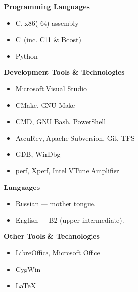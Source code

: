 \documentclass[11pt]{article}
\newcommand\CXX{C\nolinebreak[4]\hspace{-.05em}\raisebox{.4ex}{\relsize{-3}{\textbf{++}}}}
\newcommand\CvBigSkipLength{1em}
\newcommand\CvSkip[1]{\vspace{#1}}
\newcommand\CvBigSkip{\CvSkip{\CvBigSkipLength}}
\newcommand\CvSectionHeader[1]{\CvBigSkip\textbf{#1}\CvBigSkip}
\begin{document}
\begin{minipage}[t]{.5\linewidth}
  \CvSectionHeader{Programming Languages}

  \begin{itemize}
    \item C, x86(-64) assembly
    \item \CXX\ (inc. {\CXX}11 \& Boost)
    \item Python
  \end{itemize}

  \CvSectionHeader{Development Tools \& Technologies}

  \begin{itemize}
    \item Microsoft Visual Studio
    \item CMake, GNU Make
    \item CMD, GNU Bash, PowerShell
    \item AccuRev, Apache Subversion, Git, TFS
    \item GDB, WinDbg
    \item perf, Xperf, Intel VTune Amplifier
  \end{itemize}
\end{minipage}
\begin{minipage}[t]{.5\linewidth}
  \CvSectionHeader{Languages}

  \begin{itemize}
    \item Russian --- mother tongue.
    \item English --- B2 (upper intermediate).
  \end{itemize}

  \CvSectionHeader{Other Tools \& Technologies}

  \begin{itemize}
    \item LibreOffice, Microsoft Office
    \item CygWin
    \item \LaTeX
  \end{itemize}
\end{minipage}
\end{document}
